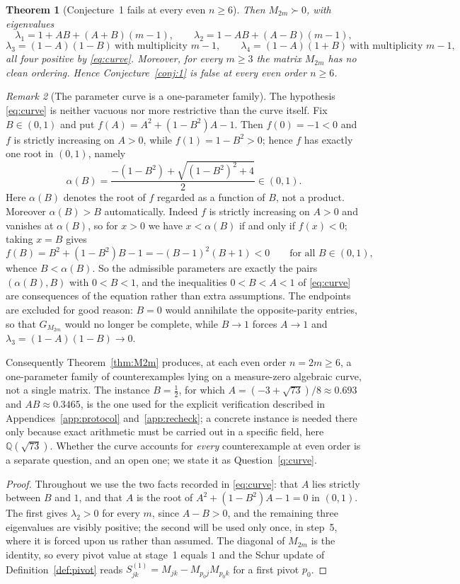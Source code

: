 \documentclass[11pt]{article}
\theoremstyle{plain}
\newtheorem{theorem}{Theorem}[section]
\theoremstyle{definition}
\theoremstyle{remark}
\newtheorem{remark}[theorem]{Remark}
\begin{document}
\begin{aiblock}
\begin{theorem}[Conjecture~1 fails at every even $n\ge6$]
Then $M_{2m}\succ0$, with eigenvalues
\[
\lambda_1=1+AB+(A+B)(m-1),\qquad
\lambda_2=1-AB+(A-B)(m-1),
\]
\[
\lambda_3=(1-A)(1-B)\ \text{with multiplicity } m-1,\qquad
\lambda_4=(1-A)(1+B)\ \text{with multiplicity } m-1,
\]
all four positive by \eqref{eq:curve}. Moreover, for every $m\ge3$ the matrix $M_{2m}$ has no clean
ordering. Hence Conjecture~\ref{conj:1} is false at every even order $n\ge6$.
\end{theorem}
\begin{remark}[The parameter curve is a one-parameter family]\label{rem:curve-family}
The hypothesis \eqref{eq:curve} is neither vacuous nor more restrictive than the curve itself. Fix
$B\in(0,1)$ and put $f(A)=A^2+(1-B^2)A-1$. Then $f(0)=-1<0$ and $f$ is strictly increasing on
$A>0$, while $f(1)=1-B^2>0$; hence $f$ has exactly one root in $(0,1)$, namely
\[
  \alpha(B)=\frac{-(1-B^2)+\sqrt{(1-B^2)^2+4}}{2}\in(0,1).
\]
Here $\alpha(B)$ denotes the root of $f$ regarded as a function of $B$, not a product.
Moreover $\alpha(B)>B$ automatically. Indeed $f$ is strictly increasing on $A>0$ and vanishes at
$\alpha(B)$, so for $x>0$ we have $x<\alpha(B)$ if and only if $f(x)<0$; taking $x=B$ gives
\[
  f(B)=B^2+(1-B^2)B-1=-(B-1)^2(B+1)<0\qquad\text{for all }B\in(0,1),
\]
whence $B<\alpha(B)$. So the admissible parameters are exactly the pairs $(\alpha(B),B)$ with
$0<B<1$, and the inequalities $0<B<A<1$ of \eqref{eq:curve} are
consequences of the equation rather than extra assumptions. The endpoints are excluded for good
reason: $B=0$ would annihilate the opposite-parity entries, so that $G_{M_{2m}}$ would no longer be
complete, while $B\to1$ forces $A\to1$ and $\lambda_3=(1-A)(1-B)\to0$.

Consequently Theorem~\ref{thm:M2m} produces, at each even order $n=2m\ge6$, a one-parameter family of
counterexamples lying on a measure-zero algebraic curve, not a single matrix. The instance $B=\tfrac12$,
for which $A=(-3+\sqrt{73})/8\approx0.693$ and $AB\approx0.3465$, is the one used for the explicit
verification described in Appendices~\ref{app:protocol} and~\ref{app:recheck}; a concrete instance is
needed there only because exact arithmetic must be carried out in a specific field, here
$\mathbb{Q}(\sqrt{73})$.
Whether the curve accounts for \emph{every} counterexample at even order is a separate
question, and an open one; we state it as Question~\ref{q:curve}.
\end{remark}
\begin{proof}
Throughout we use the two facts recorded in \eqref{eq:curve}: that $A$ lies strictly between $B$ and
$1$, and that $A$ is the root of $A^2+(1-B^2)A-1=0$ in $(0,1)$. The first gives $\lambda_2>0$ for
every $m$, since $A-B>0$, and the remaining three eigenvalues are visibly positive; the second will be
used only once, in step~5, where it is forced upon us rather than assumed. The diagonal of $M_{2m}$ is
the identity, so every pivot value at stage~1 equals $1$ and the Schur update of
Definition~\ref{def:pivot} reads $S^{(1)}_{jk}=M_{jk}-M_{p_0j}M_{p_0k}$ for a first pivot $p_0$.


\end{proof}
\end{aiblock}
\end{document}
